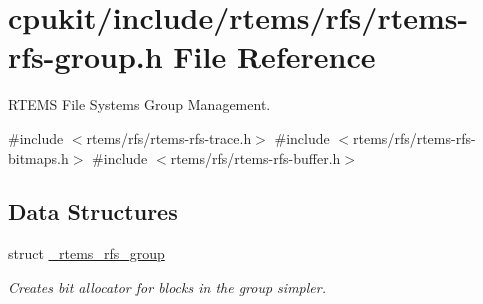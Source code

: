 \hypertarget{rtems-rfs-group_8h}{}\section{cpukit/include/rtems/rfs/rtems-\/rfs-\/group.h File Reference}
\label{rtems-rfs-group_8h}


R\+T\+E\+MS File Systems Group Management.  


{\ttfamily \#include $<$rtems/rfs/rtems-\/rfs-\/trace.\+h$>$}\newline
{\ttfamily \#include $<$rtems/rfs/rtems-\/rfs-\/bitmaps.\+h$>$}\newline
{\ttfamily \#include $<$rtems/rfs/rtems-\/rfs-\/buffer.\+h$>$}\newline
\subsection*{Data Structures}
\begin{DoxyCompactItemize}
\item 
struct \mbox{\hyperlink{struct__rtems__rfs__group}{\+\_\+rtems\+\_\+rfs\+\_\+group}}
\begin{DoxyCompactList}\small\item\em Creates bit allocator for blocks in the group simpler. \end{DoxyCompactList}\end{DoxyCompactItemize}
